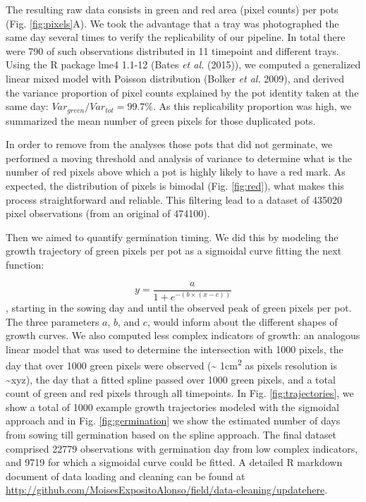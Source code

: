 \documentclass[12pt,]{article}
\begin{document}
The resulting raw data consists in green and red area (pixel counts) per
pots (Fig. \ref{fig:pixels}A). We took the advantage that a tray was
photographed the same day several times to verify the replicability of
our pipeline. In total there were 790 of such observations distributed
in 11 timepoint and different trays. Using the R package lme4 1.1-12
(Bates \emph{et al.} (2015)), we computed a generalized linear mixed
model with Poisson distribution (Bolker \emph{et al.} 2009), and derived
the variance proportion of pixel counts explained by the pot identity
taken at the same day: \(Var_{green} / Var_{tot} = 99.7 \%\). As this
replicability proportion was high, we summarized the mean number of
green pixels for those duplicated pots.

In order to remove from the analyses those pots that did not germinate,
we performed a moving threshold and analysis of variance to determine
what is the number of red pixels above which a pot is highly likely to
have a red mark. As expected, the distribution of pixels is bimodal
(Fig. \ref{fig:red}), what makes this process straightforward and
reliable. This filtering lead to a dataset of 435020 pixel observations
(from an original of 474100).

Then we aimed to quantify germination timing. We did this by modeling
the growth trajectory of green pixels per pot as a sigmoidal curve
fitting the next function:

\[y = \frac{a}{1 + e^{-(b  \times   (x-c))} } \] , starting in the
sowing day and until the observed peak of green pixels per pot. The
three parameters \(a\), \(b\), and \(c\), would inform about the
different shapes of growth curves. We also computed less complex
indicators of growth: an analogous linear model that was used to
determine the intersection with 1000 pixels, the day that over 1000
green pixels were observed (\textasciitilde{} 1cm\textsuperscript{2} as
pixels resolution is \textasciitilde{}xyz), the day that a fitted spline
passed over 1000 green pixels, and a total count of green and red pixels
through all timepoints. In Fig. \ref{fig:trajectories}, we show a total
of 1000 example growth trajectories modeled with the sigmoidal approach
and in Fig. \ref{fig:germination} we show the estimated number of days
from sowing till germination based on the spline approach. The final
dataset comprised 22779 observations with germination day from low
complex indicators, and 9719 for which a sigmoidal curve could be
fitted. A detailed R markdown document of data loading and cleaning can
be found at
\url{http://github.com/MoisesExpositoAlonso/field/data-cleaning/updatehere}.
\end{document}
